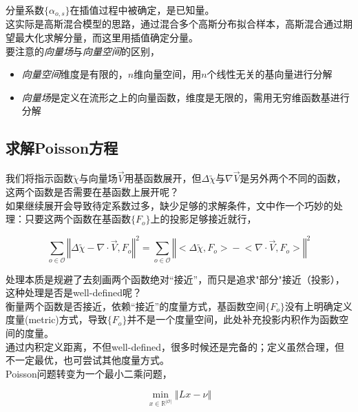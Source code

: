 		分量系数$\{\alpha_{o,s}\}$在插值过程中被确定，是已知量。\\

		这实际是高斯混合模型的思路，通过混合多个高斯分布拟合样本，高斯混合通过期望最大化求解分量，而这里用插值确定分量。\\

		要注意的\textit{向量场}与\textit{向量空间}的区别，

		\begin{itemize}
			\item \textit{向量空间}维度是有限的，$n$维向量空间，用$n$个线性无关的基向量进行分解
			\item \textit{向量场}是定义在流形之上的向量函数，维度是无限的，需用无穷维函数基进行分解
		\end{itemize}


	\subsection{求解Poisson方程}
		我们将指示函数$\tilde{\chi}$与向量场$\overrightarrow{V}$用基函数展开，但$\Delta{\tilde{\chi}}$与$\nabla \overrightarrow{V}$是另外两个不同的函数，这两个函数是否需要在基函数上展开呢？\\

		如果继续展开会导致待定系数过多，缺少足够的求解条件，文中作一个巧妙的处理：只要这两个函数在基函数$\{F_o\}$上的投影足够接近就行，

		$$
		\sum_{o \in \mathcal{O}}\left\Vert \Delta{\tilde{\chi}} - \nabla\cdot \overrightarrow{V}, F_o \right\Vert^2 
		= 
		\sum_{o \in \mathcal{O}}\left\Vert \big<\Delta{\tilde{\chi}}, F_o\big> 
			- 
			\big<\nabla\cdot \overrightarrow{V}, F_o\big> \right\Vert^2
		$$

		处理本质是规避了去刻画两个函数绝对“接近”，而只是追求"部分"接近（投影），这种处理是否是well-defined呢？\\

		衡量两个函数是否接近，依赖“接近”的度量方式，基函数空间$\{F_o\}$没有上明确定义度量(metric)方式，导致$\{F_o\}$并不是一个度量空间，此处补充投影内积作为函数空间的度量。\\

		通过内积定义距离，不但well-defined，很多时候还是完备的；定义虽然合理，但不一定最优，也可尝试其他度量方式。\\

		Poisson问题转变为一个最小二乘问题，

		$$
			\min_{x\in \mathbb{R}^{|\mathcal{O}|}} \left\Vert Lx - \nu\right\Vert
		$$

